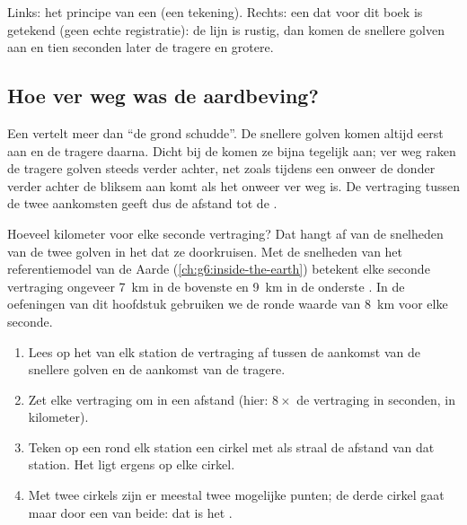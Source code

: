\begin{omfigure}
{\small Links: het principe van een  (een tekening). Rechts: een
 dat voor dit boek is getekend (geen echte registratie): de lijn
is rustig, dan komen de snellere golven aan en tien seconden later de
tragere en grotere.}
\label{fig:g7:earthquakes:seismometer}
\end{omfigure}

\subsection*{Hoe ver weg was de aardbeving?}

Een  vertelt meer dan ``de grond schudde''. De snellere golven
komen altijd eerst aan en de tragere daarna. Dicht bij de  komen ze
bijna tegelijk aan; ver weg raken de tragere golven steeds verder achter,
net zoals tijdens een onweer de donder verder achter de bliksem aan komt
als het onweer ver weg is. De vertraging tussen de twee aankomsten geeft
dus de afstand tot de .

Hoeveel kilometer voor elke seconde vertraging? Dat hangt af van de
snelheden van de twee golven in het  dat ze doorkruisen. Met de
snelheden van het referentiemodel van de Aarde
(\cref{ch:g6:inside-the-earth}) betekent elke seconde vertraging ongeveer
\qty{7}{km} in de bovenste  en \qty{9}{km} in de onderste
. In de oefeningen van dit hoofdstuk gebruiken we de ronde waarde
van \qty{8}{km} voor elke seconde.

\begin{method}\label{met:g7:earthquakes:three-circles}
\begin{enumerate}
  \item Lees op het  van elk station de vertraging af tussen de
        aankomst van de snellere golven en de aankomst van de tragere.
  \item Zet elke vertraging om in een afstand (hier: $8 \times$ de
        vertraging in seconden, in kilometer).
  \item Teken op een  rond elk station een cirkel met als straal de
        afstand van dat station. Het  ligt ergens op elke cirkel.
  \item Met twee cirkels zijn er meestal twee mogelijke punten; de derde
        cirkel gaat maar door een van beide: dat is het .
\end{enumerate}
\end{method}

